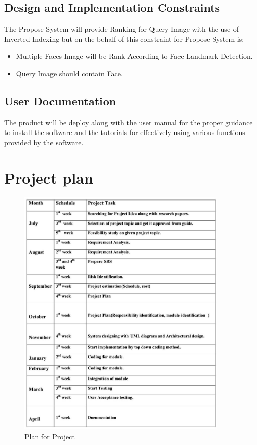 \subsection{\normalsize{Design and Implementation Constraints}}
The Propose System will provide Ranking for Query Image with the use of Inverted Indexing but on the behalf of this constraint for Propose System is:
\begin{itemize}
\item Multiple Faces Image will be Rank According to Face Landmark Detection.
\item Query Image should contain Face.
\end{itemize}
\subsection{\normalsize{User Documentation}}
The product will be deploy along with the user manual for the proper guidance to install the software and the tutorials for effectively using various functions provided by the software.
\newpage
\section{\normalsize{\textbf{Project plan}}}
\begin{figure}[ht!]
	\centering
		\includegraphics[width=100mm]{plan.jpg}
	\caption{Plan for Project}
	\label{fig:plan}
\end{figure}

